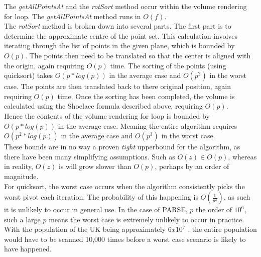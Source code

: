 The \textit{getAllPointsAt} and the \textit{rotSort} method occur within the volume rendering for loop. The  \textit{getAllPointsAt} method runs in  $O(f)$.\\

The \textit{rotSort} method is broken down into several parts. The first part is to determine the approximate centre of the point set. This calculation involves iterating through the list of points in the given plane, which is bounded by $O(p)$. The points then need to be translated so that the center is aligned with the origin, again requiring $O(p)$ time. The sorting of the points (using quicksort) takes $O(p * log(p))$ in the average case and $O(p^2)$ in the worst case. The points are then translated back to there original position, again requiring $O(p)$ time. Once the sorting has been completed, the volume is calculated using the Shoelace formula described above, requiring $O(p)$.\\

Hence the contents of the volume rendering for loop is bounded by $O(p * log(p))$ in the average case. Meaning the entire algorithm requires $O(p^2 * log(p))$ in the average case and $O(p^3)$ in the worst case. \\

These bounds are in no way a proven \textit{tight} upperbound for the algorithm, as there have been many simplifying assumptions. Such as $O(z) \in O(p)$, whereas in reality, $O(z)$ is will grow slower than $O(p)$, perhaps by an order of magnitude.\\

For quicksort, the worst case occurs when the algorithm consistently picks the worst pivot each iteration. The probability of this happening is $O(\frac{1}{p^2})$, as such it is unlikely to occur in general use. In the case of PARSE, $p$ the order of $10^6$, such a large $p$ means the worst case is extremely unlikely to occur in practice. With the population of the UK being approximately $6x10^7$ \cite{UnitedKingdomofGreatBritain2011}, the entire population would have to be scanned 10,000 times before a worst case scenario is likely to have happened.